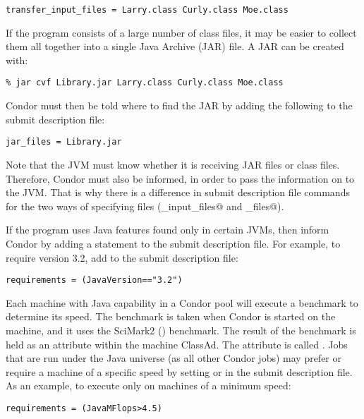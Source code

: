 \begin{verbatim}
transfer_input_files = Larry.class Curly.class Moe.class
\end{verbatim}

If the program consists of a large number of class files,
it may be easier to collect them all together into
a single Java Archive (JAR) file.
A JAR can be created with:

\begin{verbatim}
% jar cvf Library.jar Larry.class Curly.class Moe.class
\end{verbatim}

Condor must then be told where to find the JAR by
adding the 
following to the submit description file:

\begin{verbatim}
jar_files = Library.jar
\end{verbatim}

Note that the JVM must know whether it is receiving JAR files
or class files.
Therefore, Condor must also be informed, in order to pass the
information on to the JVM.
That is why there is a difference in submit description file commands
for the two ways of specifying files (\verb@transfer_input_files@
and \verb@jar_files@).

If the program uses Java features found only in certain
JVMs, then inform Condor by adding a 
statement to the submit description file.
For example, to require version 3.2, add to the submit description
file:

\begin{verbatim}
requirements = (JavaVersion=="3.2")
\end{verbatim}

Each machine with Java capability in a Condor pool
will execute a benchmark to determine its speed.
The benchmark is taken when Condor is started on
the machine, and it uses the SciMark2
() benchmark.
The result of the benchmark is held as an attribute
within the 
machine ClassAd.
The attribute is called .
Jobs that are run under the Java universe (as all other Condor jobs)
may prefer or require a machine of a specific speed
by setting  or  in
the submit description file.
As an example, to execute only on machines of a minimum speed:

\begin{verbatim}
requirements = (JavaMFlops>4.5)
\end{verbatim}

